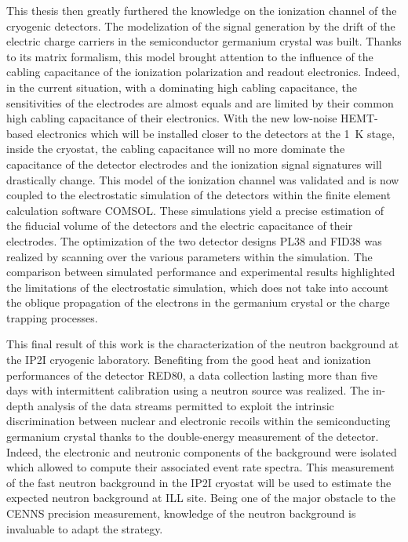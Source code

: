 This thesis then greatly furthered the knowledge on the ionization channel of the cryogenic detectors. The modelization of the signal generation by the drift of the electric charge carriers in the semiconductor germanium crystal was built.
Thanks to its matrix formalism, this model brought attention to the influence of the cabling capacitance of the ionization polarization and readout electronics.   
Indeed, in the current situation, with a dominating high cabling capacitance, the sensitivities of the electrodes are almost equals and are limited by their common high cabling capacitance of their electronics. With the new low-noise HEMT-based electronics which will be installed closer to the detectors at the \SI{1}{\kelvin} stage, inside the \Ricochet{} cryostat, the cabling capacitance will no more dominate the capacitance of the detector electrodes and the ionization signal signatures will drastically change.
This model of the ionization channel was validated and is now coupled to the electrostatic simulation of the detectors within the finite element calculation software COMSOL\textsuperscript{\textregistered}. These simulations yield a precise estimation of the fiducial volume of the detectors and the electric capacitance of their electrodes.
The optimization of the two detector designs PL38 and FID38 was realized by scanning over the various parameters within the simulation. The comparison between simulated performance and experimental results highlighted the limitations of the electrostatic simulation, which does not take into account the oblique propagation of the electrons in the germanium crystal or the charge trapping processes.

This final result of this work is the characterization of the neutron background at the IP2I cryogenic laboratory. Benefiting from the good heat and ionization performances of the detector RED80, a data collection lasting more than five days with intermittent calibration using a neutron source was realized.
The in-depth analysis of the data streams permitted to exploit the intrinsic discrimination between nuclear and electronic recoils within the semiconducting germanium crystal thanks to the double-energy measurement of the detector. Indeed, the electronic and neutronic components of the background were isolated which allowed to compute their associated event rate spectra.
This measurement of the fast neutron background in the IP2I cryostat will be used to estimate the expected neutron background at ILL site. Being one of the major obstacle to the CENNS precision measurement, knowledge of the neutron background is invaluable to adapt the \Ricochet{} strategy.

